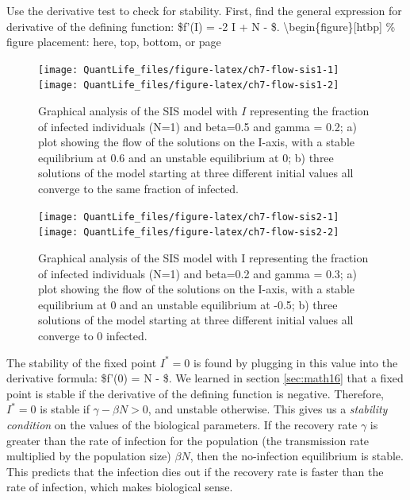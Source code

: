 \documentclass[
]{book}
\theoremstyle{definition}
\theoremstyle{definition}
\theoremstyle{definition}
\theoremstyle{remark}
\begin{document}
Use the derivative test to check for stability. First, find the general expression for derivative of the defining function: \$f'(I) = -2 \beta I + \beta N - \gamma \$.
\textbackslash begin\{figure\}{[}htbp{]} \% figure placement: here, top, bottom, or page

\begin{figure}

{\centering \texttt{[image: QuantLife\_files/figure-latex/ch7-flow-sis1-1]} \texttt{[image: QuantLife\_files/figure-latex/ch7-flow-sis1-2]} 

}

\caption{Graphical analysis of the SIS model with $I$ representing the fraction of infected individuals (N=1) and beta=0.5 and gamma = 0.2; a) plot showing the flow of the solutions on the I-axis, with a stable equilibrium at 0.6 and an unstable equilibrium at 0; b) three solutions of the model starting at three different initial values all converge to the same fraction of infected.}\label{fig:ch7-flow-sis1}
\end{figure}

\begin{figure}

{\centering \texttt{[image: QuantLife\_files/figure-latex/ch7-flow-sis2-1]} \texttt{[image: QuantLife\_files/figure-latex/ch7-flow-sis2-2]} 

}

\caption{Graphical analysis of the SIS model with I representing the fraction of infected individuals (N=1) and beta=0.2 and gamma = 0.3; a) plot showing the flow of the solutions on the I-axis, with a stable equilibrium at 0 and an unstable equilibrium at -0.5; b) three solutions of the model starting at three different initial values all converge to 0 infected.}\label{fig:ch7-flow-sis2}
\end{figure}

The stability of the fixed point \(I^* = 0\) is found by plugging in this value into the derivative formula: \$f'(0) = \beta N - \gamma \$. We learned in section \ref{sec:math16} that a fixed point is stable if the derivative of the defining function is negative. Therefore, \(I^* = 0\) is stable if \(\gamma - \beta N > 0\), and unstable otherwise. This gives us a  \emph{stability condition} on the values of the biological parameters. If the recovery rate \(\gamma\) is greater than the rate of infection for the population (the transmission rate multiplied by the population size) \(\beta N\), then the no-infection equilibrium is stable. This predicts that the infection dies out if the recovery rate is faster than the rate of infection, which makes biological sense.
\end{document}
